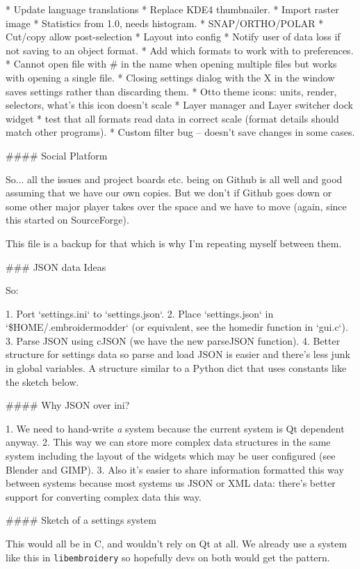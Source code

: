 * Update language translations
* Replace KDE4 thumbnailer.
* Import raster image
* Statistics from 1.0, needs histogram.
* SNAP/ORTHO/POLAR
* Cut/copy allow post-selection
* Layout into config
* Notify user of data loss if not saving to an object format.
* Add which formats to work with to preferences.
* Cannot open file with \# in the name when opening multiple files but  works with opening a single file.
* Closing settings dialog with the X in the window saves settings rather than discarding them.
* Otto theme icons: units, render, selectors, what's this icon doesn't scale
* Layer manager and Layer switcher dock widget
*  test that all formats read data in correct scale (format details should match other programs).
* Custom filter bug -- doesn't save changes in some cases.

#### Social Platform

So... all the issues and project boards etc. being on Github is all
well and good assuming that we have our own copies. But we don't if
Github goes down or some other major player takes over the space and we
have to move (again, since this started on SourceForge).

This file is a backup for that which is why I'm repeating myself between
them.

### JSON data Ideas

So:

1. Port `settings.ini` to `settings.json`.
2. Place `settings.json` in `\$HOME/.embroidermodder` (or equivalent, see the homedir function in `gui.c`).
3. Parse JSON using cJSON (we have the new parseJSON function).
4. Better structure for settings data so parse and load JSON is easier and there's less junk in global variables. A structure similar to a Python dict that uses constants like the sketch below.

#### Why JSON over ini?

1. We need to hand-write \emph{a} system because the current system is Qt dependent anyway.
2. This way we can store more complex data structures in the same system including the layout of the widgets which may be user configured (see Blender and GIMP).
3. Also it's easier to share information formatted this way between systems because most systems us JSON or XML data: there's better support for converting complex data this way.

#### Sketch of a settings system


This would all be in C, and wouldn't rely on Qt at all. We already use a
system like this in \texttt{libembroidery} so hopefully devs on both
would get the pattern.

